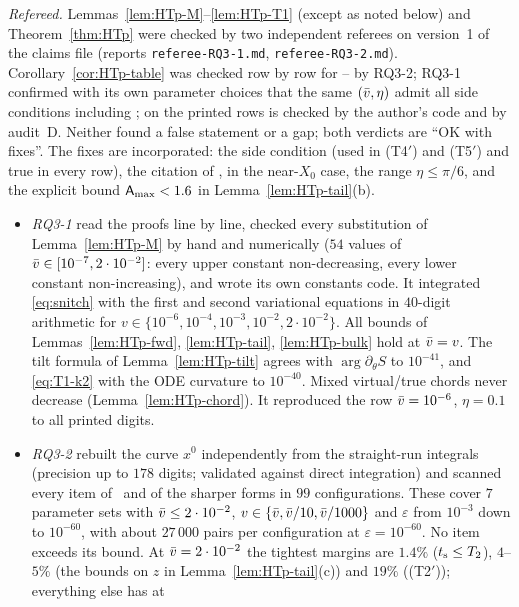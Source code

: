 \begin{remark}[Status]\label{rem:HTp-status}
\emph{Refereed.} Lemmas~\ref{lem:HTp-M}--\ref{lem:HTp-T1} (except as noted below) and Theorem~\ref{thm:HTp} were checked by two
independent referees on version~1 of the claims file (reports \texttt{referee-RQ3-1.md}, \texttt{referee-RQ3-2.md}).
Corollary~\ref{cor:HTp-table} was checked row by row for -- by RQ3-2; RQ3-1 confirmed with its own parameter choices
that the same $(\bar v,\eta)$ admit all side conditions including ;  on the printed rows is checked by the author's
code and by audit~D. Neither found a false statement or a gap; both verdicts are ``OK with fixes''. The fixes are incorporated:
the side condition  (used in \textup{(T4$'$)} and \textup{(T5$'$)} and true in every row), the citation of , 
in the near-$X_0$ case, the range $\eta\le\pi/6$, and the explicit bound $\mathsf A_{\max}<1.6$ in Lemma~\ref{lem:HTp-tail}(b).
\begin{itemize}
\item \emph{RQ3-1} read the proofs line by line, checked every substitution of Lemma~\ref{lem:HTp-M} by hand and numerically
($54$ values of $\bar v\in[10^{-7},2\cdot10^{-2}]$: every upper constant non-decreasing, every lower constant non-increasing), and wrote its
own constants code. It integrated \eqref{eq:snitch} with the first and second variational equations in $40$-digit arithmetic for
$v\in\{10^{-6},10^{-4},10^{-3},10^{-2},2\cdot10^{-2}\}$. All bounds of Lemmas~\ref{lem:HTp-fwd}, \ref{lem:HTp-tail}, \ref{lem:HTp-bulk} hold at
$\bar v=v$. The tilt formula of Lemma~\ref{lem:HTp-tilt} agrees with $\arg\partial_\theta S$ to $10^{-41}$, and \eqref{eq:T1-k2} with the ODE
curvature to $10^{-40}$. Mixed virtual/true chords never decrease (Lemma~\ref{lem:HTp-chord}). It reproduced the row $\bar v=10^{-6}$,
$\eta=0.1$ to all printed digits.
\item \emph{RQ3-2} rebuilt the curve $x^0$ independently from the straight-run integrals (precision up to $178$ digits; validated
against direct integration) and scanned every item of \MHT\ and of the sharper forms in $99$ configurations. These cover $7$
parameter sets with $\bar v\le2\cdot10^{-2}$, $v\in\{\bar v,\bar v/10,\bar v/1000\}$ and $\varepsilon$ from $10^{-3}$ down to $10^{-60}$, with about
$27\,000$ pairs per configuration at $\varepsilon=10^{-60}$. No item exceeds its bound. At $\bar v=2\cdot10^{-2}$ the tightest margins are
$1.4\%$ ($t_{\mathrm s}\le T_2$), $4$--$5\%$ (the bounds on $z$ in Lemma~\ref{lem:HTp-tail}(c)) and $19\%$ (\textup{(T2$'$)}); everything else has at

\end{itemize}
\end{remark}
